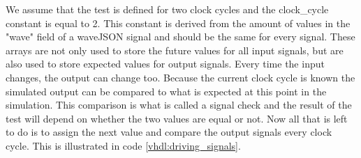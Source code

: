 We assume that the test is defined for two clock cycles and the clock\_cycle constant is equal to 2. This constant is derived from the amount of values in the "wave" field of a waveJSON signal and should be the same for every signal.
\npar
These arrays are not only used to store the future values for all input signals, but are also used to store expected values for output signals. Every time the input changes, the output can change too. Because the current clock cycle is known the simulated output can be compared to what is expected at this point in the simulation. This comparison is what is called a signal check and the result of the test will depend on whether the two values are equal or not.
\npar
Now all that is left to do is to assign the next value and compare the output signals every clock cycle. This is illustrated in code \ref{vhdl:driving_signals}.
